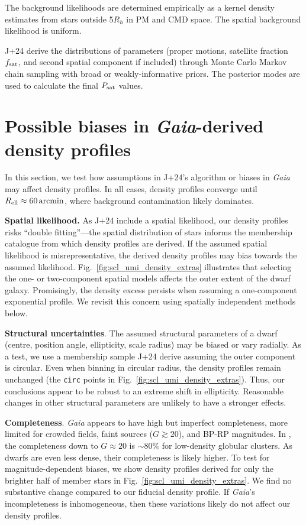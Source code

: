The background likelihoods are determined empirically as a kernel
density estimates from stars outside 5\(R_h\) in PM and CMD space. The
spatial background likelihood is uniform.

J+24 derive the distributions of parameters (proper motions, satellite
fraction \(f_{\rm sat}\), and second spatial component if included)
through Monte Carlo Markov chain sampling with broad or
weakly-informative priors. The posterior modes are used to calculate the
final \(P_{\rm sat}\) values.

\section{\texorpdfstring{Possible biases in \emph{Gaia}-derived density
profiles}{Possible biases in Gaia-derived density profiles}}\label{sec:density_extra}

In this section, we test how assumptions in J+24's algorithm or biases
in \emph{Gaia} may affect density profiles. In all cases, density
profiles converge until \(R_{\rm ell} \approx 60\,{\rm arcmin}\), where
background contamination likely dominates.

\textbf{Spatial likelihood.} As J+24 include a spatial likelihood, our
density profiles risks ``double fitting''---the spatial distribution of
stars informs the membership catalogue from which density profiles are
derived. If the assumed spatial likelihood is misrepresentative, the
derived density profiles may bias towards the assumed likelihood.
Fig.~\ref{fig:scl_umi_density_extras} illustrates that selecting the
one- or two-component spatial models affects the outer extent of the
dwarf galaxy. Promisingly, the density excess persists when assuming a
one-component exponential profile. We revisit this concern using
spatially independent methods below.

\textbf{Structural uncertainties}. The assumed structural parameters of
a dwarf (centre, position angle, ellipticity, scale radius) may be
biased or vary radially. As a test, we use a membership sample J+24
derive assuming the outer component is circular. Even when binning in
circular radius, the density profiles remain unchanged (the
\texttt{circ} points in Fig.~\ref{fig:scl_umi_density_extras}). Thus,
our conclusions appear to be robust to an extreme shift in ellipticity.
Reasonable changes in other structural parameters are unlikely to have a
stronger effects.

\textbf{Completeness}. \emph{Gaia} appears to have high but imperfect
completeness, more limited for crowded fields, faint sources
(\(G\gtrsim20\)), and BP-RP magnitudes. In \citet{fabricius+2021}, the
completeness down to \(G\approx 20\) is \(\sim 80\%\) for low-density
globular clusters. As dwarfs are even less dense, their completeness is
likely higher. To test for magnitude-dependent biases, we show density
profiles derived for only the brighter half of member stars in
Fig.~\ref{fig:scl_umi_density_extras}. We find no substantive change
compared to our fiducial density profile. If \emph{Gaia}'s
incompleteness is inhomogeneous, then these variations likely do not
affect our density profiles.

